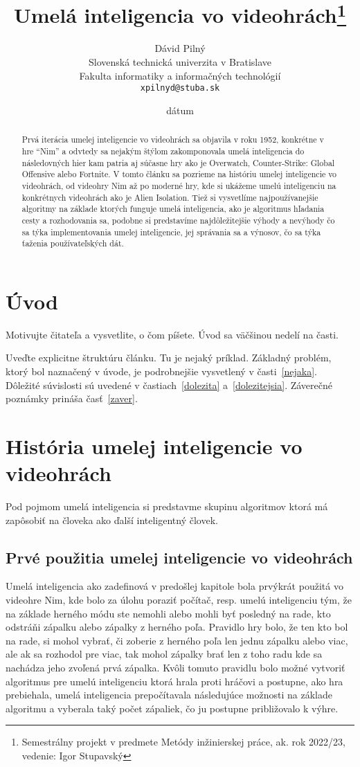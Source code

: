 \documentclass[10pt,twoside,slovak,a4paper]{article}
\title{Umelá inteligencia vo videohrách\thanks{Semestrálny projekt v predmete Metódy inžinierskej práce, ak. rok 2022/23, vedenie: Igor Stupavský}} %
\author{Dávid Pilný\\[2pt]
	{\small Slovenská technická univerzita v Bratislave}\\
	{\small Fakulta informatiky a informačných technológií}\\
	{\small \texttt{xpilnyd@stuba.sk}}
	}
\date{\small dátum} %
\begin{document}
\maketitle

\begin{abstract}
Prvá iterácia umelej inteligencie vo videohrách sa objavila v roku 1952, konkrétne v hre “Nim” a odvtedy sa nejakým štýlom zakomponovala umelá inteligencia do následovných hier kam patria aj súčasne hry ako je Overwatch, Counter-Strike: Global Offensive alebo Fortnite.
V tomto článku sa pozrieme na históriu umelej inteligencie vo videohrách, od videohry Nim až po moderné hry, kde si ukážeme umelú inteligenciu na konkrétnych videohrách ako je Alien Isolation. 
Tiež si vysvetlíme najpoužívanejšie algoritmy na základe ktorých funguje umelá inteligencia, ako je algoritmus hľadania cesty a rozhodovania sa, podobne si predstavíme najdôležitejšie výhody a nevýhody čo sa týka implementovania umelej inteligencie, jej správania sa a výnosov, čo sa týka ťaženia používateľských dát.
\end{abstract}



\section{Úvod}

Motivujte čitateľa a vysvetlite, o čom píšete. Úvod sa väčšinou nedelí na časti.

Uveďte explicitne štruktúru článku. Tu je nejaký príklad.
Základný problém, ktorý bol naznačený v úvode, je podrobnejšie vysvetlený v časti~\ref{nejaka}.
Dôležité súvislosti sú uvedené v častiach~\ref{dolezita} a~\ref{dolezitejsia}.
Záverečné poznámky prináša časť~\ref{zaver}.



\section{História umelej inteligencie vo videohrách} \label{kapitola2}
Pod pojmom umelá inteligencia si predstavme skupinu algoritmov ktorá má zapôsobiť na človeka ako ďalší inteligentný človek.

\subsection{Prvé použitia umelej inteligencie vo videohrách} \label{kapitola2.1}
Umelá inteligencia ako zadefinová v predošlej kapitole bola prvýkrát použitá vo videohre Nim, kde bolo za úlohu poraziť počítač, resp. umelú inteligenciu tým, že na základe herného módu ste nemohli alebo mohli byť posledný na rade, kto odstráňi zápalku alebo zápalky z herného poľa. Pravidlo hry bolo, že ten kto bol na rade, si mohol vybrať, či zoberie z herného poľa len jednu zápalku alebo viac, ale ak sa rozhodol pre viac, tak mohol zápalky brať len z toho radu kde sa nachádza jeho zvoľená prvá zápalka. Kvôli tomuto pravidlu bolo možné vytvoriť algoritmus pre umelú inteligenciu ktorá hrala proti hráčovi a postupne, ako hra prebiehala, umelá inteligencia prepočítavala následujúce možnosti na základe algoritmu a vyberala taký počet zápaliek, čo ju postupne približovalo k výhre.
\end{document}
